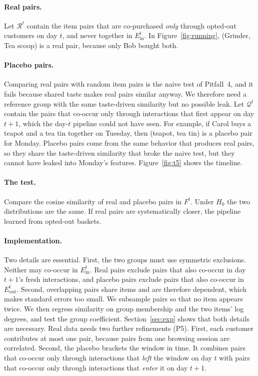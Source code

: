 \documentclass[10pt,twocolumn,letterpaper]{article}
\theoremstyle{definition}
\newcommand{\Ein}{E_{\mathrm{in}}}
\newcommand{\Eout}{E_{\mathrm{out}}}
\begin{document}
\paragraph{Real pairs.}
Let $\mathcal{R}^t$ contain the item pairs that are co-purchased \emph{only} through
opted-out customers on day $t$, and never together in $\Ein^t$. In
Figure~\ref{fig:running}, (Grinder, Tea scoop) is a real pair, because only Bob
bought both.

\paragraph{Placebo pairs.}
Comparing real pairs with random item pairs is the naive test of Pitfall~4, and it
fails because shared taste makes real pairs similar anyway. We therefore
need a reference group with the same taste-driven similarity but no possible
leak. Let $\mathcal{Q}^t$ contain the pairs that co-occur only through interactions
that first appear on day $t{+}1$, which the day-$t$ pipeline could not have seen.
For example, if Carol buys a teapot and a tea tin together on Tuesday, then
(teapot, tea tin) is a placebo pair for Monday. Placebo pairs come from the
same behavior that produces real pairs, so they share the taste-driven
similarity that broke the naive test, but they cannot have leaked into
Monday's features. Figure~\ref{fig:t5} shows the timeline.

\paragraph{The test.}
Compare the cosine similarity of real and placebo pairs in $F^t$. Under $H_0$ the
two distributions are the same. If real pairs are systematically closer, the
pipeline learned from opted-out baskets.

\paragraph{Implementation.}
Two details are essential. First, the two groups must use symmetric
exclusions. Neither may co-occur in $\Ein^t$. Real pairs exclude pairs that also
co-occur in day $t{+}1$'s fresh interactions, and placebo pairs exclude pairs
that also co-occur in $\Eout^t$. Second, overlapping pairs share items and are
therefore dependent, which makes standard errors too small. We subsample pairs
so that no item appears twice. We then regress similarity on group membership
and the two items' log degrees, and test the group coefficient.
Section~\ref{sec:exp} shows that both details are necessary. Real data needs
two further refinements (P5). First, each customer contributes at most one
pair, because pairs from one browsing session are correlated. Second, the
placebo brackets the window in time. It combines pairs that co-occur only
through interactions that \emph{left} the window on day $t$ with pairs that
co-occur only through interactions that \emph{enter} it on day $t{+}1$.
\end{document}
